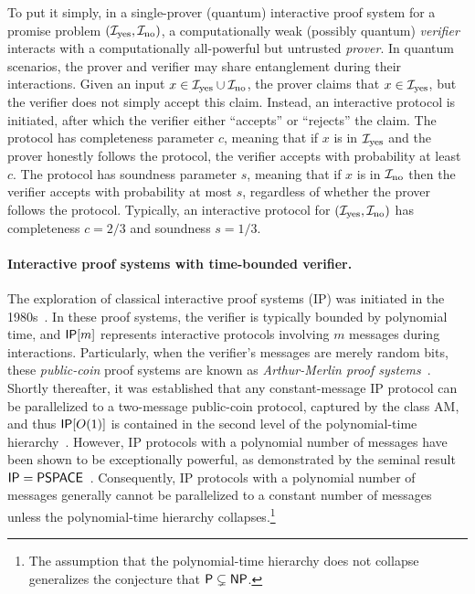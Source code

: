 \documentclass[10pt,a4paper]{article}
\numberwithin{equation}{section}
\numberwithin{figure}{section}
\newcommand{\Ptime}{\textnormal{\textsf{P}}\xspace}
\newcommand{\NP}{\textnormal{\textsf{NP}}\xspace}
\newcommand{\AM}{\textnormal{\textsf{AM}}\xspace}
\newcommand{\IP}{\textnormal{\textsf{IP}}\xspace}
\newcommand{\PSPACE}{\textnormal{\textsf{PSPACE}}\xspace}
\newcommand{\yes}{{\rm yes}}
\newcommand{\no}{{\rm no}}
\newcommand{\calI}{\mathcal{I}}
\begin{document}
To put it simply, in a single-prover (quantum) interactive proof system for a promise problem $(\calI_{\yes},\calI_{\no})$, a computationally weak (possibly quantum) \textit{verifier} interacts with a computationally all-powerful but untrusted \textit{prover}. In quantum scenarios, the prover and verifier may share entanglement during their interactions. Given an input $x\in \calI_\yes \cup \calI_\no$, the prover claims that $x \in \calI_{\yes}$, but the verifier does not simply accept this claim. Instead, an interactive protocol is initiated, after which the verifier either ``accepts'' or ``rejects'' the claim. The protocol has completeness parameter $c$, meaning that if $x$ is in $\calI_{\yes}$ and the prover honestly follows the protocol, the verifier accepts with probability at least $c$. The protocol has soundness parameter $s$, meaning that if $x$ is in $\calI_{\no}$ then the verifier accepts with probability at most $s$, regardless of whether the prover follows the protocol. Typically, an interactive protocol for $(\calI_{\yes},\calI_{\no})$ has completeness $c=2/3$ and soundness $s=1/3$. 

\paragraph{Interactive proof systems with time-bounded verifier.}
The exploration of classical interactive proof systems (\IP{}) was initiated in the 1980s~\cite{Babai85,GMR85}. In these proof systems, the verifier is typically bounded by polynomial time, and $\IP[m]$ represents interactive protocols involving $m$ messages during interactions. Particularly, when the verifier's messages are merely random bits, these \textit{public-coin} proof systems are known as \textit{Arthur-Merlin proof systems}~\cite{Babai85}. Shortly thereafter, it was established that any constant-message \IP{} protocol can be parallelized to a two-message public-coin protocol, captured by the class \AM{}, and thus $\IP[O(1)]$ is contained in the second level of the polynomial-time hierarchy~\cite{Babai85,GS86}. However, \IP{} protocols with a polynomial number of messages have been shown to be exceptionally powerful, as demonstrated by the seminal result $\IP = \PSPACE$~\cite{LFKN92,Shamir92}. Consequently, \IP{} protocols with a polynomial number of messages generally cannot be parallelized to a constant number of messages unless the polynomial-time hierarchy collapses.\footnote{The assumption that the polynomial-time hierarchy does not collapse generalizes the conjecture that $\Ptime \subsetneq \NP$.} 
\end{document}
